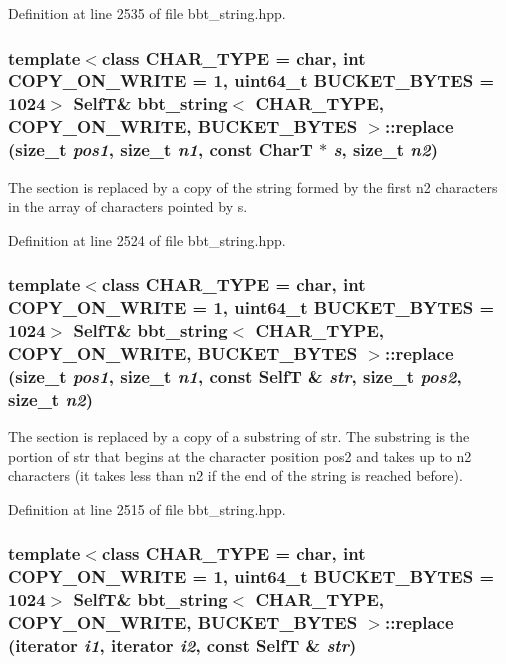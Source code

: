 Definition at line 2535 of file bbt\_\-string.hpp.\hypertarget{classbbt__string_2855c7c1db09f625b3d0fc7311a61923}{
\subsubsection[{replace}]{\setlength{\rightskip}{0pt plus 5cm}template$<$class CHAR\_\-TYPE  = char, int COPY\_\-ON\_\-WRITE = 1, uint64\_\-t BUCKET\_\-BYTES = 1024$>$ {\bf SelfT}\& {\bf bbt\_\-string}$<$ CHAR\_\-TYPE, COPY\_\-ON\_\-WRITE, BUCKET\_\-BYTES $>$::replace (size\_\-t {\em pos1}, \/  size\_\-t {\em n1}, \/  const CharT $\ast$ {\em s}, \/  size\_\-t {\em n2})}}
\label{classbbt__string_2855c7c1db09f625b3d0fc7311a61923}


The section is replaced by a copy of the string formed by the first n2 characters in the array of characters pointed by s. 

Definition at line 2524 of file bbt\_\-string.hpp.\hypertarget{classbbt__string_56380b00db98648281e47a98db7877b9}{
\subsubsection[{replace}]{\setlength{\rightskip}{0pt plus 5cm}template$<$class CHAR\_\-TYPE  = char, int COPY\_\-ON\_\-WRITE = 1, uint64\_\-t BUCKET\_\-BYTES = 1024$>$ {\bf SelfT}\& {\bf bbt\_\-string}$<$ CHAR\_\-TYPE, COPY\_\-ON\_\-WRITE, BUCKET\_\-BYTES $>$::replace (size\_\-t {\em pos1}, \/  size\_\-t {\em n1}, \/  const {\bf SelfT} \& {\em str}, \/  size\_\-t {\em pos2}, \/  size\_\-t {\em n2})}}
\label{classbbt__string_56380b00db98648281e47a98db7877b9}


The section is replaced by a copy of a substring of str. The substring is the portion of str that begins at the character position pos2 and takes up to n2 characters (it takes less than n2 if the end of the string is reached before). 

Definition at line 2515 of file bbt\_\-string.hpp.\hypertarget{classbbt__string_51dbd7d4611fe6d60c4238786281d25e}{
\subsubsection[{replace}]{\setlength{\rightskip}{0pt plus 5cm}template$<$class CHAR\_\-TYPE  = char, int COPY\_\-ON\_\-WRITE = 1, uint64\_\-t BUCKET\_\-BYTES = 1024$>$ {\bf SelfT}\& {\bf bbt\_\-string}$<$ CHAR\_\-TYPE, COPY\_\-ON\_\-WRITE, BUCKET\_\-BYTES $>$::replace (iterator {\em i1}, \/  iterator {\em i2}, \/  const {\bf SelfT} \& {\em str})}}
\label{classbbt__string_51dbd7d4611fe6d60c4238786281d25e}


